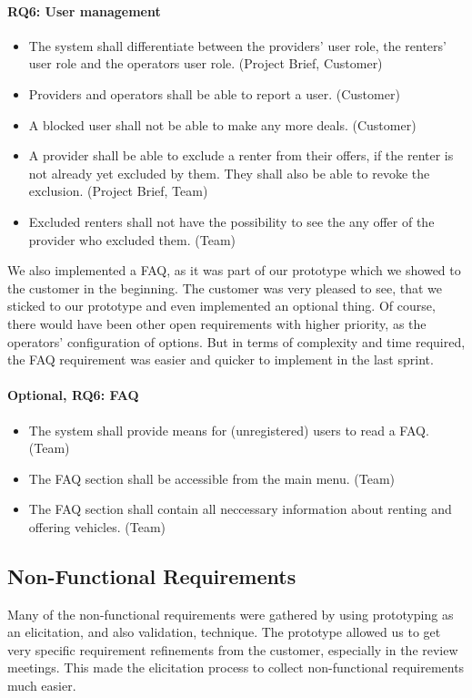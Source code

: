 \paragraph{RQ6: User management}
\begin{itemize}
    \item The system shall differentiate between the providers' user role, the renters' user role and the operators user role. (Project Brief, Customer)
    \item Providers and operators shall be able to report a user. (Customer)
    \item A blocked user shall not be able to make any more deals. (Customer)
    \item A provider shall be able to exclude a renter from their offers, if the renter is not already yet excluded by them. They shall also be able to revoke the exclusion. (Project Brief, Team)
    \item Excluded renters shall not have the possibility to see the any offer of the provider who excluded them. (Team)
\end{itemize}

We also implemented a FAQ, as it was part of our prototype which we showed to the customer in the beginning.
The customer was very pleased to see, that we sticked to our prototype and even implemented an optional thing.
Of course, there would have been other open requirements with higher priority, as the operators' configuration of options.
But in terms of complexity and time required, the FAQ requirement was easier and quicker to implement in the last sprint.

\paragraph{Optional, RQ6: FAQ}
\begin{itemize}
    \item  The system shall provide means for (unregistered) users to read a FAQ. (Team)
    \item The FAQ section shall be accessible from the main menu. (Team)
    \item The FAQ section shall contain all neccessary information about renting and offering vehicles. (Team)
\end{itemize}

\subsection{Non-Functional Requirements}
Many of the non-functional requirements were gathered by using prototyping as an elicitation, and also validation, technique.
The prototype allowed us to get very specific requirement refinements from the customer, especially in the review meetings.
This made the elicitation process to collect non-functional requirements much easier.

